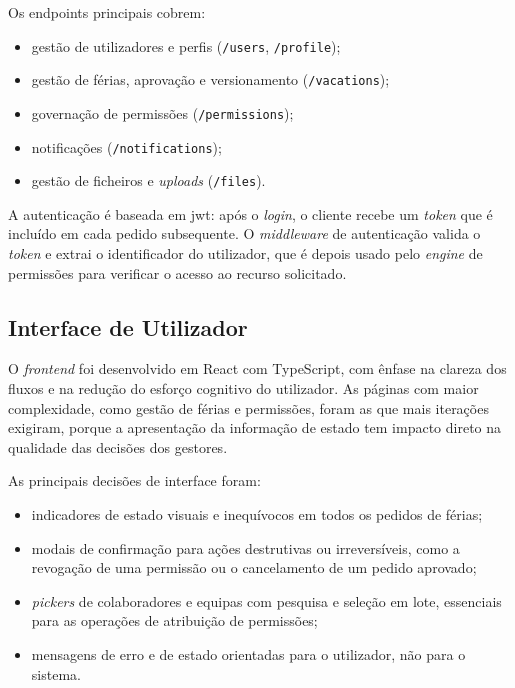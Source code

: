 \documentclass[12pt, a4paper, twoside, openright]{report}
\begin{document}
Os endpoints principais cobrem:

\begin{itemize}
  \item gestão de utilizadores e perfis (\texttt{/users}, \texttt{/profile});
  \item gestão de férias, aprovação e versionamento (\texttt{/vacations});
  \item governação de permissões (\texttt{/permissions});
  \item notificações (\texttt{/notifications});
  \item gestão de ficheiros e \textit{uploads} (\texttt{/files}).
\end{itemize}

A autenticação é baseada em \gls{jwt}: após o \textit{login}, o cliente recebe um
\textit{token} que é incluído em cada pedido subsequente. O \textit{middleware} de
autenticação valida o \textit{token} e extrai o identificador do utilizador, que é
depois usado pelo \textit{engine} de permissões para verificar o acesso ao recurso
solicitado.

\subsection{Interface de Utilizador}

O \textit{frontend} foi desenvolvido em React com TypeScript, com ênfase na clareza
dos fluxos e na redução do esforço cognitivo do utilizador. As páginas com maior
complexidade, como gestão de férias e permissões, foram as que mais iterações
exigiram, porque a apresentação da informação de estado tem impacto direto na
qualidade das decisões dos gestores.

As principais decisões de interface foram:

\begin{itemize}
  \item indicadores de estado visuais e inequívocos em todos os pedidos de férias;
  \item modais de confirmação para ações destrutivas ou irreversíveis, como a
        revogação de uma permissão ou o cancelamento de um pedido aprovado;
  \item \textit{pickers} de colaboradores e equipas com pesquisa e seleção em lote,
        essenciais para as operações de atribuição de permissões;
  \item mensagens de erro e de estado orientadas para o utilizador, não para o
        sistema.
\end{itemize}
\end{document}
